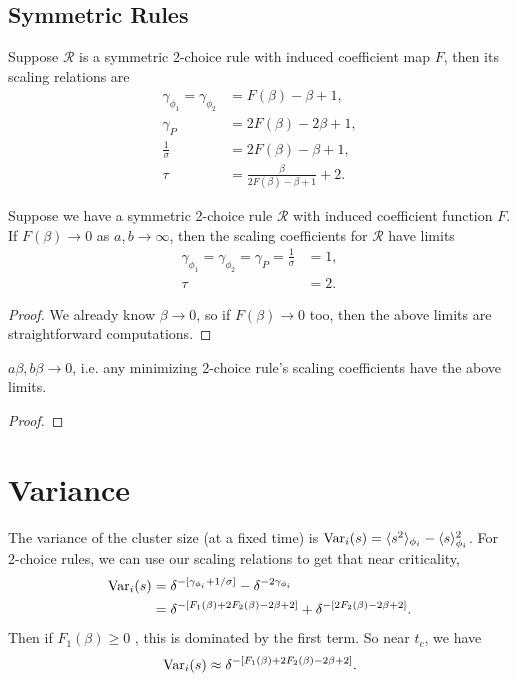 \documentclass[twoside,10pt]{article}
\begin{document}
\subsection{Symmetric Rules}

Suppose $\mathcal{R}$ is a symmetric 2-choice rule with induced coefficient map $F$, then its scaling relations are
\begin{align*}
	\gamma_{\phi_1} = \gamma_{\phi_2} &= F(\beta)-\beta+1,\\
	\gamma_{P} &= 2F(\beta) - 2\beta+1,\\
	\frac{1}{\sigma}  &= 2F(\beta)-\beta+1,\\
	\tau &= \frac{\beta}{2F(\beta)-\beta+1} +2.
\end{align*}

\begin{prop}[]
	Suppose we have a symmetric 2-choice rule $\mathcal{R}$ with induced coefficient function $F$. If $F(\beta) \to 0$ as $a,b \to \infty$, then the scaling coefficients for $\mathcal{R}$ have limits
	\begin{align*}
		\gamma_{\phi_1} = \gamma_{\phi_2} = \gamma_{P} = \frac{1}{\sigma} &= 1,\\
		\tau &= 2.
	\end{align*}
\end{prop}
\begin{proof}
	We already know $\beta \to 0$, so if $F(\beta)\to 0$ too, then the above limits are straightforward computations.
\end{proof}

\begin{thrm}[]
	\label{thrm:m-beta-0}
$a \beta, b \beta \to 0$, i.e. any minimizing 2-choice rule's scaling coefficients have the above limits.
\end{thrm}
\begin{proof}
\end{proof}

\section{Variance}

The variance of the cluster size (at a fixed time) is $\operatorname{Var}_i(s) = \langle s^2 \rangle_{\phi_i} - \langle s \rangle^2_{\phi_i}$. For 2-choice rules, we can use our scaling relations to get that near criticality,
\begin{align*}
	\operatorname{Var}_i(s) &= \delta^{-[\gamma_{\phi_i} + 1/\sigma]} - \delta^{-2\gamma_{\phi_i}} \\
		  &= \delta^{-[F_1(\beta)+2F_2(\beta)-2\beta+2]} + \delta^{-[2F_2(\beta)-2\beta+2]}.
\end{align*}
Then if $F_1(\beta) \geq 0$ , this is dominated by the first term. So near $t_c$, we have
\[
	\operatorname{Var}_i(s) \approx \delta^{-[F_1(\beta)+2F_2(\beta)-2\beta+2]}.
\] 
\end{document}
